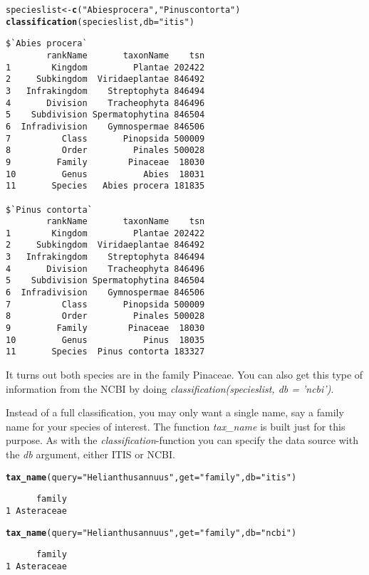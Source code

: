 \documentclass[10pt]{article}\usepackage[]{graphicx}\usepackage[]{color}
\makeatletter
\newcommand{\hlstr}[1]{\textcolor[rgb]{0.192,0.494,0.8}{#1}}%
\newcommand{\hlkwd}[1]{\textcolor[rgb]{0.737,0.353,0.396}{\textbf{#1}}}%
\newenvironment{kframe}{%
 \def\at@end@of@kframe{}%
 \ifinner\ifhmode%
  \def\at@end@of@kframe{\end{minipage}}%
  \begin{minipage}{\columnwidth}%
 \fi\fi%
 \def\FrameCommand##1{\hskip\@totalleftmargin \hskip-\fboxsep
 \colorbox{shadecolor}{##1}\hskip-\fboxsep
     \hskip-\linewidth \hskip-\@totalleftmargin \hskip\columnwidth}%
 \MakeFramed {\advance\hsize-\width
   \@totalleftmargin\z@ \linewidth\hsize
   \@setminipage}}%
 {\par\unskip\endMakeFramed%
 \at@end@of@kframe}
\newenvironment{knitrout}{}{} %
\makeatother
\begin{document}
\begin{knitrout}
\color{fgcolor}\begin{kframe}
\begin{alltt}
specieslist <- \hlkwd{c}(\hlstr{"Abies procera"}, \hlstr{"Pinus contorta"})
\hlkwd{classification}(specieslist, db = \hlstr{"itis"})
\end{alltt}
\begin{verbatim}
$`Abies procera`
        rankName       taxonName    tsn
1        Kingdom         Plantae 202422
2     Subkingdom  Viridaeplantae 846492
3   Infrakingdom    Streptophyta 846494
4       Division    Tracheophyta 846496
5    Subdivision Spermatophytina 846504
6  Infradivision    Gymnospermae 846506
7          Class       Pinopsida 500009
8          Order         Pinales 500028
9         Family        Pinaceae  18030
10         Genus           Abies  18031
11       Species   Abies procera 181835

$`Pinus contorta`
        rankName       taxonName    tsn
1        Kingdom         Plantae 202422
2     Subkingdom  Viridaeplantae 846492
3   Infrakingdom    Streptophyta 846494
4       Division    Tracheophyta 846496
5    Subdivision Spermatophytina 846504
6  Infradivision    Gymnospermae 846506
7          Class       Pinopsida 500009
8          Order         Pinales 500028
9         Family        Pinaceae  18030
10         Genus           Pinus  18035
11       Species  Pinus contorta 183327
\end{verbatim}
\end{kframe}
\end{knitrout}


It turns out both species are in the family Pinaceae. You can also get this type of information from the NCBI by doing \emph{classification(specieslist, db = 'ncbi')}.

Instead of a full classification, you may only want a single name, say a family name for your species of interest. The function \emph{tax\_name} is built just for this purpose. As with the \emph{classification}-function you can specify the data source with the \emph{db} argument, either ITIS or NCBI. 

\begin{knitrout}
\color{fgcolor}\begin{kframe}
\begin{alltt}
\hlkwd{tax_name}(query = \hlstr{"Helianthus annuus"}, get = \hlstr{"family"}, db = \hlstr{"itis"})
\end{alltt}
\begin{verbatim}
      family
1 Asteraceae
\end{verbatim}
\begin{alltt}
\hlkwd{tax_name}(query = \hlstr{"Helianthus annuus"}, get = \hlstr{"family"}, db = \hlstr{"ncbi"})
\end{alltt}
\begin{verbatim}
      family
1 Asteraceae
\end{verbatim}
\end{kframe}
\end{knitrout}
\end{document}
